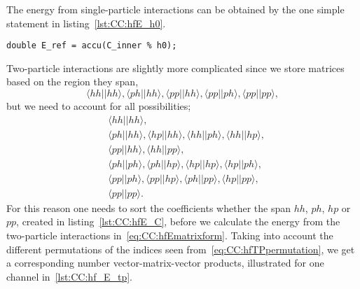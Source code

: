 The energy from single-particle interactions can be obtained by the one simple statement in listing~\ref{lst:CC:hfE_h0}.
\begin{lstlisting}[float,label={lst:CC:hfE_h0},caption={H0 part of hf E}]
double E_ref = accu(C_inner % h0);
\end{lstlisting}
Two-particle interactions are slightly more complicated since we store matrices based on the region they span,
\begin{equation}
\langle hh||hh\rangle, \langle ph||hh\rangle, \langle pp||hh \rangle, \langle pp||ph \rangle, \langle pp||pp \rangle ,
\end{equation}
but we need to account for all possibilities;
\begin{equation}
\label{eq:CC:hfTPpermutation}
\begin{split}
&\langle hh||hh\rangle, \\
&\langle ph||hh\rangle, \langle hp||hh \rangle, \langle hh||ph\rangle, \langle hh||hp\rangle, \\
&\langle pp||hh \rangle, \langle hh||pp \rangle, \\
&\langle ph||ph \rangle, \langle ph||hp\rangle, \langle hp||hp\rangle, \langle hp||ph\rangle,\\
&\langle pp||ph \rangle, \langle pp||hp \rangle, \langle ph||pp \rangle, \langle hp||pp\rangle, \\
&\langle pp||pp \rangle .
\end{split}
\end{equation}
For this reason one needs to sort the coefficients whether the span $hh$, $ph$, $hp$ or $pp$, created in listing~\ref{lst:CC:hfE_C}, before we calculate the energy from the two-particle interactions in~\eqref{eq:CC:hfEmatrixform}.
Taking into account the different permutations of the indices seen from~\eqref{eq:CC:hfTPpermutation}, we get a corresponding number  vector-matrix-vector products, illustrated for one channel in~\ref{lst:CC:hf_E_tp}.





